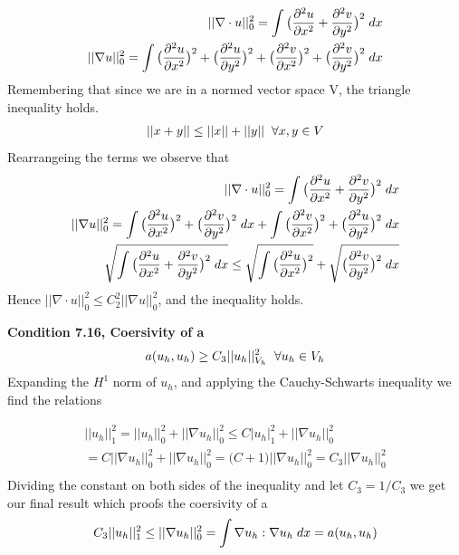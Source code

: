 \documentclass[a4paper,norsk]{article}
\begin{document}
\begin{align*}
 ||\nabla \cdot u||_0^2 = \int \big(\frac{\partial^2 u}{\partial x^2} + \frac{\partial^2 v}{\partial y^2}\big)^2 \hspace{1mm} dx \\
 ||\nabla u||_0^2 = \int \big(\frac{\partial^2 u}{\partial x^2}\big)^2 + \big(\frac{\partial^2 u}{\partial y^2} \big)^2 + 
 \big(\frac{\partial^2 v}{\partial x^2} \big)^2 + \big( \frac{\partial^2 v}{\partial y^2} \big)^2 \hspace{1mm} dx
\end{align*}
Remembering that since we are in a normed vector space V, the triangle inequality holds.
\begin{align*}
||x + y || \leq ||x|| + ||y|| \hspace{2mm} \forall x,y \in V
\end{align*}
Rearrangeing the terms we observe that 
\begin{align*}
 ||\nabla \cdot u||_0^2 = \int \big(\frac{\partial^2 u}{\partial x^2} + \frac{\partial^2 v}{\partial y^2}\big)^2 \hspace{1mm} dx \\
 ||\nabla u||_0^2 = \int \big(\frac{\partial^2 u}{\partial x^2}\big)^2 
 +  \big( \frac{\partial^2 v}{\partial y^2} \big)^2 \hspace{1mm} dx
 + \int \big(\frac{\partial^2 v}{\partial x^2} \big)^2 + 
  \big(\frac{\partial^2 u}{\partial y^2} \big)^2  \hspace{1mm} dx \\
  \sqrt{ \int \big(\frac{\partial^2 u}{\partial x^2} + \frac{\partial^2 v}{\partial y^2}\big)^2 \hspace{1mm} dx }\leq 
 \sqrt{ \int \big(\frac{\partial^2 u}{\partial x^2}\big)^2} 
 + \sqrt{ \big( \frac{\partial^2 v}{\partial y^2} \big)^2 \hspace{1mm} dx }
\end{align*}
Hence $||\nabla \cdot u||_0^2 \leq C_2^2 ||\nabla u ||_0^2$, and the inequality holds. 

\textbf{Condition 7.16, Coersivity of a}
\begin{align*}
 a(u_h, u_h) \geq C_3 ||u_h||_{V_h}^2 \hspace{2mm} \forall u_h \in V_h
\end{align*}
Expanding the $H^1$ norm of $u_h$, and applying the Cauchy-Schwarts inequality we find the relations

\begin{align*}
||u_h||_1^2 = ||u_h||_0^2 + ||\nabla u_h||_0^2 \leq C|u_h|_1^2 + ||\nabla u_h||_0^2 \\
= C||\nabla u_h||_0^2 + ||\nabla u_h||_0^2 = \big(C + 1\big)||\nabla u_h||_0^2 = C_3 ||\nabla u_h||_0^2 \\
\end{align*}
Dividing the constant on both sides of the inequality and let $C_3 = 1/C_3$ we get our final result which proofs the coersivity of a
\begin{align*}
C_3||u_h||_1^2 \leq ||\nabla u_h||_0^2 = \int \nabla u_h : \nabla u_h \hspace{1mm} dx = a(u_h, u_h)
\end{align*}
\end{document}
